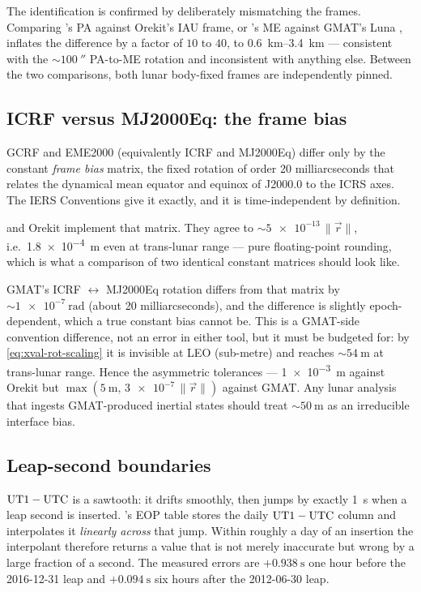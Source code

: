 The identification is confirmed by deliberately mismatching the frames.
Comparing \lupnt{}'s PA against Orekit's IAU frame, or \lupnt{}'s ME against
GMAT's Luna , inflates the difference by a factor of $10$ to
$40$, to \SIrange{0.6}{3.4}{\kilo\meter} --- consistent with the
${\sim}\SI{100}{\arcsecond}$ PA-to-ME rotation and inconsistent with anything
else. Between the two comparisons, both \lupnt{} lunar body-fixed frames are
independently pinned.

\subsection{ICRF versus MJ2000Eq: the frame bias}
\label{sec:xval-bias}

GCRF and EME2000 (equivalently ICRF and MJ2000Eq) differ only by the constant
\emph{frame bias} matrix, the fixed rotation of order 20 milliarcseconds
that relates the dynamical mean equator and equinox of J2000.0 to the ICRS
axes. The IERS Conventions \citep{iers2010} give it exactly, and it is
time-independent by definition.

\lupnt{} and Orekit implement that matrix. They agree to
${\sim}\num{5e-13}\,\lVert\vec r\rVert$, i.e.\ \SI{1.8e-4}{\meter} even at
trans-lunar range --- pure floating-point rounding, which is what a
comparison of two identical constant matrices should look like.

GMAT's ICRF $\leftrightarrow$ MJ2000Eq rotation differs from that matrix by
${\sim}\SI{1e-7}{\radian}$ (about 20 milliarcseconds), and the
difference is slightly epoch-dependent, which a true constant bias cannot be.
This is a GMAT-side convention difference, not an error in either tool, but it
must be budgeted for: by \cref{eq:xval-rot-scaling} it is invisible at LEO
(sub-metre) and reaches ${\sim}\SI{54}{\meter}$ at trans-lunar range. Hence
the asymmetric tolerances --- \SI{1e-3}{\meter} against Orekit but
$\max(\SI{5}{\meter},\, \num{3e-7}\,\lVert\vec r\rVert)$ against GMAT. Any
lunar analysis that ingests GMAT-produced inertial states should treat
${\sim}\SI{50}{\meter}$ as an irreducible interface bias.

\subsection{Leap-second boundaries}
\label{sec:xval-leap}

$\mathrm{UT1}-\mathrm{UTC}$ is a sawtooth: it drifts smoothly, then jumps by exactly
\SI{1}{\second} when a leap second is inserted. \lupnt{}'s EOP table stores
the daily $\mathrm{UT1}-\mathrm{UTC}$ column and interpolates it \emph{linearly across} that
jump. Within roughly a day of an insertion the interpolant therefore returns a
value that is not merely inaccurate but wrong by a large fraction of a second.
The measured errors are $+\SI{0.938}{\second}$ one hour before the
2016-12-31 leap and $+\SI{0.094}{\second}$ six hours after the 2012-06-30
leap.

